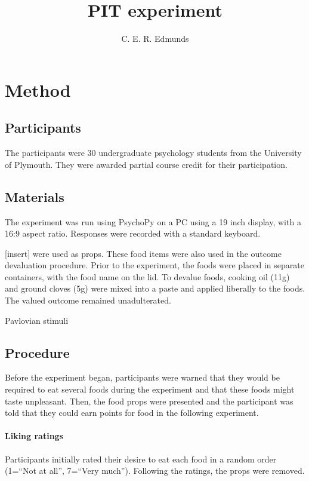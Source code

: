 \documentclass[12pt]{article}
\title{PIT experiment}
\author{C. E. R. Edmunds}
\date{}%
\begin{document}

\newpage
\doublespacing

\section{Method}
\subsection{Participants}
The participants were $30$ undergraduate psychology students from the
University of Plymouth. They were awarded partial course credit for their
participation. 

\subsection{Materials}
The experiment was run using PsychoPy \cite{Peirce2007, Peirce2009} on a PC
using a 19 inch display, with a 16:9 aspect ratio. Responses were recorded with
a standard keyboard.

[insert] were used as props. These food items were also used in the outcome
devaluation procedure. Prior to the experiment, the foods were placed in
separate containers, with the food name on the lid. To devalue foods, cooking
oil (11g) and ground cloves (5g) were mixed into a paste and applied liberally
to the foods. The valued outcome remained unadulterated. 

Pavlovian stimuli


\subsection{Procedure}
Before the experiment began, participants were warned that they would be
required to eat several foods during the experiment and that these foods might
taste unpleasant. Then, the food props were presented and the participant was
told that they could earn points for food in the following experiment.

\paragraph{Liking ratings} Participants initially rated their desire to eat
each food in a random order (1=``Not at all'', 7=``Very much''). Following the
ratings, the props were removed. 
\end{document}
